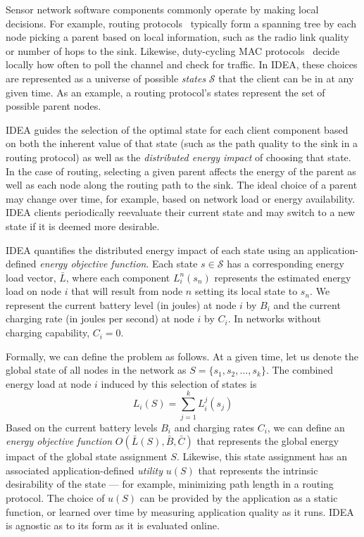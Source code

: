 Sensor network software components commonly operate by making local
decisions. For example, routing protocols~\cite{ctp,awoo-multihop} typically
form a spanning tree by each node picking a parent based on local
information, such as the radio link quality or number of hops to the sink.
Likewise, duty-cycling MAC protocols~\cite{bmac-sensys04} decide locally how
often to poll the channel and check for traffic. In IDEA, these choices are
represented as a universe of possible \textit{states} $\mathcal{S}$ that the
client can be in at any given time. As an example, a routing protocol's
states represent the set of possible parent nodes.

IDEA guides the selection of the optimal state for each client component
based on both the inherent value of that state (such as the path quality to
the sink in a routing protocol) as well as the \textit{distributed energy
impact} of choosing that state. In the case of routing, selecting a given
parent affects the energy of the parent as well as each node along the
routing path to the sink. The ideal choice of a parent may change over time,
for example, based on network load or energy availability. IDEA clients
periodically reevaluate their current state and may switch to a new state if
it is deemed more desirable.

IDEA quantifies the distributed energy impact of each state using an
application-defined \textit{energy objective function}. Each state $s \in
\mathcal{S}$ has a corresponding energy load vector, $\bar{L}$, where each
component $L_i^n(s_n)$ represents the estimated energy load on node $i$ that
will result from node $n$ setting its local state to $s_n$. We represent the
current battery level (in joules) at node $i$ by $B_i$ and the current
charging rate (in joules per second) at node $i$ by $C_i$. In networks
without charging capability, $C_i = 0$.

Formally, we can define the problem as follows. At a given time, let us
denote the global state of all nodes in the network as $S = \{ s_1, s_2,
\ldots, s_k \}$. The combined energy load at node $i$ induced by this
selection of states is \[ L_i(S) = \sum_{j=1}^k L_i^j(s_j) \] Based on the
current battery levels $B_i$ and charging rates $C_i$, we can define an
\textit{energy objective function} $O(\bar{L}(S), \bar{B}, \bar{C})$ that
represents the global energy impact of the global state assignment $S$.
Likewise, this state assignment has an associated application-defined
\textit{utility} $u(S)$ that represents the intrinsic desirability of the
state --- for example, minimizing path length in a routing protocol. The
choice of $u(S)$ can be provided by the application as a static function, or
learned over time by measuring application quality as it runs. IDEA is
agnostic as to its form as it is evaluated online. 

